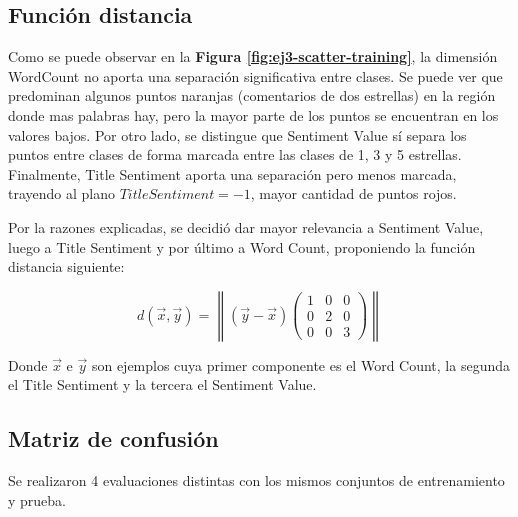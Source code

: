 \documentclass[a4paper]{article}
\newcommand{\reffig}[1]{\textbf{Figura \ref{#1}}}
\begin{document}
\subsection{Función distancia}
Como se puede observar en la \reffig{fig:ej3-scatter-training}, la dimensión WordCount no aporta una separación significativa entre clases. Se puede ver que predominan algunos puntos naranjas (comentarios de dos estrellas) en la región donde mas palabras hay, pero la mayor parte de los puntos se encuentran en los valores bajos. Por otro lado, se distingue que Sentiment Value sí separa los puntos entre clases de forma marcada entre las clases de 1, 3 y 5 estrellas. Finalmente, Title Sentiment aporta una separación pero menos marcada, trayendo al plano $TitleSentiment = -1$, mayor cantidad de puntos rojos.

Por la razones explicadas, se decidió dar mayor relevancia a Sentiment Value, luego a Title Sentiment y por último a Word Count, proponiendo la función distancia siguiente:

\begin{equation}
  d(\vec{x},\vec{y}) = \left \|(\vec{y}-\vec{x})\begin{pmatrix}
    1 & 0 & 0\\ 
    0 & 2 & 0\\ 
    0 & 0 & 3
    \end{pmatrix}\right \|
\end{equation}

Donde $\vec{x}$ e $\vec{y}$ son ejemplos cuya primer componente es el Word Count, la segunda el Title Sentiment y la tercera el Sentiment Value.

\subsection{Matriz de confusión}

Se realizaron 4 evaluaciones distintas con los mismos conjuntos de entrenamiento y prueba.
\end{document}
